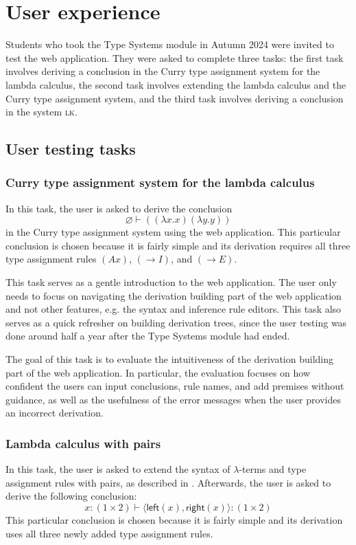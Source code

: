 \section{User experience}
Students who took the Type Systems module in Autumn 2024 were invited to test the web application. They were asked to complete three tasks: the first task involves deriving a conclusion in the Curry type assignment system for the lambda calculus, the second task involves extending the lambda calculus and the Curry type assignment system, and the third task involves deriving a conclusion in the system \textsc{lk}.

\subsection{User testing tasks}
\subsubsection{Curry type assignment system for the lambda calculus}
In this task, the user is asked to derive the conclusion
\[
    \varnothing \vdash ((\lambda x. x)(\lambda y. y))
\]
in the Curry type assignment system using the web application. This particular conclusion is chosen because it is fairly simple and its derivation requires all three type assignment rules $(Ax)$, $(\to I)$, and $(\to E)$.

This task serves as a gentle introduction to the web application. The user only needs to focus on navigating the derivation building part of the web application and not other features, e.g. the syntax and inference rule editors. This task also serves as a quick refresher on building derivation trees, since the user testing was done around half a year after the Type Systems module had ended.

The goal of this task is to evaluate the intuitiveness of the derivation building part of the web application. In particular, the evaluation focuses on how confident the users can input conclusions, rule names, and add premises without guidance, as well as the usefulness of the error messages when the user provides an incorrect derivation.

\subsubsection{Lambda calculus with pairs}
In this task, the user is asked to extend the syntax of $\lambda$-terms and type assignment rules with pairs, as described in . Afterwards, the user is asked to derive the following conclusion:
\[
    x: (1 \times 2) \vdash \langle \textsf{left}(x), \textsf{right}(x) \rangle: (1 \times 2)
\]
This particular conclusion is chosen because it is fairly simple and its derivation uses all three newly added type assignment rules.

